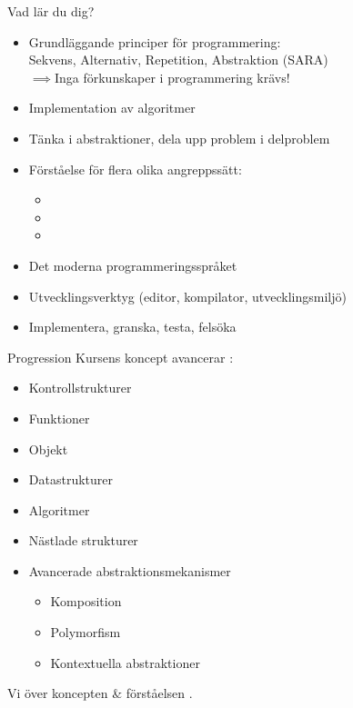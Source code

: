 \begin{Slide}{Vad lär du dig?}
\begin{itemize}
\item Grundläggande principer för programmering:\\ Sekvens, Alternativ, Repetition, Abstraktion (SARA)\\$\implies$Inga förkunskaper i programmering krävs!
\item Implementation av algoritmer
\item Tänka i abstraktioner, dela upp problem i delproblem
\item Förståelse för flera olika angreppssätt:
\begin{itemize}
\item {}%
\item {}%
\item {}%
\end{itemize}
\item Det moderna programmeringsspråket  %
\item Utvecklingsverktyg (editor, kompilator, utvecklingsmiljö)
\item Implementera, granska, testa, felsöka
\end{itemize}
\end{Slide}

\begin{Slide}{Progression}
Kursens koncept avancerar :
\begin{itemize}
\item Kontrollstrukturer
\item Funktioner
\item Objekt
\item Datastrukturer 
\item Algoritmer
\item Nästlade strukturer
\item Avancerade abstraktionsmekanismer
\begin{itemize}
\item Komposition
\item Polymorfism
\item Kontextuella abstraktioner
\end{itemize}
\end{itemize}
Vi  över koncepten \&  förståelsen .
\end{Slide}


